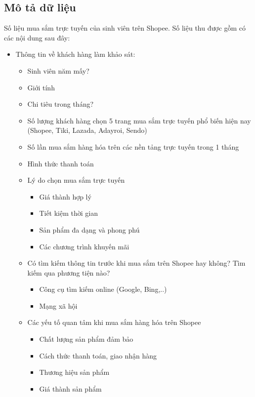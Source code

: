\documentclass[a4paper]{article}
\theoremstyle{definition}
\begin{document}
\begin{itemize}
\subsection{Mô tả dữ liệu}
Số liệu mua sắm trực tuyến của sinh viên trên Shopee. Số liệu thu được gồm có các nội dung sau đây:
\begin{itemize}
    \item Thông tin về khách hàng làm khảo sát:
    \begin{itemize}
        \item Sinh viên năm mấy?
        \item Giới tính
        \item Chi tiêu trong tháng?
        \item Số lượng khách hàng chọn 5 trang mua sắm trực tuyến phổ biến hiện nay (Shopee, Tiki, Lazada, Adayroi, Sendo)
        \item Số lần mua sắm hàng hóa trên các nền tảng trực tuyến trong 1 tháng
        \item Hình thức thanh toán
        \item Lý do chọn mua sắm trực tuyến
        \begin{itemize}
            \item Giá thành hợp lý
            \item Tiết kiệm thời gian
            \item Sản phẩm đa dạng và phong phú
            \item Các chương trình khuyến mãi
        \end{itemize}
        \item Có tìm kiếm thông tin trước khi mua sắm trên Shopee hay không? Tìm kiếm qua phương tiện nào?
         \begin{itemize}
            \item Công cụ tìm kiếm online (Google, Bing,..)
            \item Mạng xã hội
         \end{itemize}
        \item Các yếu tố quan tâm khi mua sắm hàng hóa trên Shopee
        \begin{itemize}
            \item Chất lượng sản phẩm đảm bảo
            \item Cách thức thanh toán, giao nhận hàng
            \item Thương hiệu sản phẩm
            \item Giá thành sản phẩm
        \end{itemize}

\end{itemize}
\end{itemize}
\end{itemize}
\end{document}
